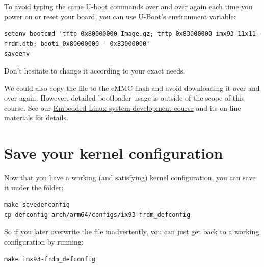 To avoid typing the same U-boot commands over and over again each time
you power on or reset your board, you can use U-Boot's 
environment variable:

{\footnotesize
\begin{verbatim}
setenv bootcmd 'tftp 0x80000000 Image.gz; tftp 0x83000000 imx93-11x11-frdm.dtb; booti 0x80000000 - 0x83000000'
saveenv
\end{verbatim}
}

Don't hesitate to change it according to your exact needs.

We could also copy the  file to the eMMC flash and avoid
downloading it over and over again. However, detailed bootloader
usage is outside of the scope of this course. See our
\href{https://bootlin.com/training/embedded-linux/}{Embedded
Linux system development course} and its on-line materials for
details.

\section{Save your kernel configuration}

Now that you have a working (and satisfying) kernel configuration, you
can save it under the  folder:

\begin{verbatim}
make savedefconfig
cp defconfig arch/arm64/configs/ix93-frdm_defconfig
\end{verbatim}

So if you later overwrite the  file inadvertently, you can
just get back to a working configuration by running:

\begin{verbatim}
make imx93-frdm_defconfig
\end{verbatim}
